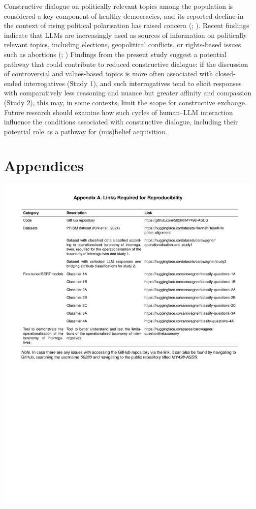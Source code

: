 \documentclass[
  12pt,
]{article}
\begin{document}
Constructive dialogue on politically relevant topics among the population is considered a key component of healthy democracies, and its reported decline in the context of rising political polarisation has raised concern (; ). Recent findings indicate that LLMs are increasingly used as sources of information on politically relevant topics, including elections, geopolitical conflicts, or rights-based issues such as abortions (; ) Findings from the present study suggest a potential pathway that could contribute to reduced constructive dialogue: if the discussion of controversial and values-based topics is more often associated with closed-ended interrogatives (Study 1), and such interrogatives tend to elicit responses with comparatively less reasoning and nuance but greater affinity and compassion (Study 2), this may, in some contexts, limit the scope for constructive exchange. Future research should examine how such cycles of human--LLM interaction influence the conditions associated with constructive dialogue, including their potential role as a pathway for (mis)belief acquisition.

\section{Appendices}\label{appendices}

\begin{center}\includegraphics{../03_outputs/04_appendices/appendix_a} \end{center}
\end{document}
